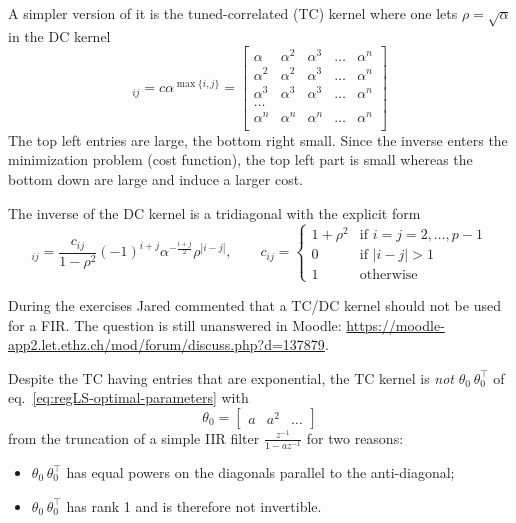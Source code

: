 A simpler version of it is the tuned-correlated (TC) kernel where one lets $\rho = \sqrt{\alpha}$ in the DC kernel
\begin{equation*}
  [P]_{ij} = c\alpha^{\max\{i,j\}} =
  \begin{bmatrix}
    \alpha   & \alpha^2 & \alpha^3 & \ldots & \alpha^n \\
    \alpha^2 & \alpha^2 & \alpha^3 & \ldots & \alpha^n \\
    \alpha^3 & \alpha^3 & \alpha^3 & \ldots & \alpha^n \\
    \ldots \\
    \alpha^n & \alpha^n & \alpha^n & \ldots & \alpha^n \\
  \end{bmatrix}
\end{equation*}
The top left entries are large, the bottom right small. Since the inverse enters the minimization problem (cost function), the top left part is small whereas the bottom down are large and induce a larger cost.

The inverse of the DC kernel is a tridiagonal with the explicit form
\begin{equation*}
  [P^{-1}]_{ij} = \frac{c_{ij}}{1-\rho^2}(-1)^{i+j}\alpha^{-\frac{i+j}{2}}\rho^{|i-j|},\hspace{2em} c_{ij} =
  \begin{cases}
    1 + \rho^2 & \textrm{if } i=j=2,\ldots,p-1 \\
    0 & \textrm{if } |i-j| > 1 \\
    1 & \textrm{otherwise}
  \end{cases}
\end{equation*}

During the exercises Jared commented that a TC/DC kernel should not be used for a FIR. The question is still unanswered in Moodle: \url{https://moodle-app2.let.ethz.ch/mod/forum/discuss.php?d=137879}.

Despite the TC having entries that are exponential, the TC kernel is \emph{not} $\theta_0^{\phantom{\top}} \theta_0^\top$ of eq.~\eqref{eq:regLS-optimal-parameters} with
\begin{equation*}
  \theta_0 =
  \begin{bmatrix}
    a & a^2 & \ldots
  \end{bmatrix}
\end{equation*}
from the truncation of a simple IIR filter $\tfrac{z^{-1}}{1-az^{-1}}$ for two reasons:
\begin{itemize}
\item $\theta_0^{\phantom{\top}} \theta_0^\top$ has equal powers on the diagonals parallel to the anti-diagonal;
\item $\theta_0^{\phantom{\top}} \theta_0^\top$ has rank 1 and is therefore not invertible.
\end{itemize}


